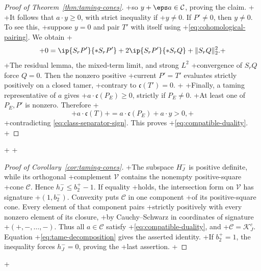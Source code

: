 \begin{proof}[Proof of Theorem~\ref{thm:taming-cones}]
+so \(y+\eps a\in\mathcal C\), proving the claim.
+
+It follows that \(a\cdot y\ge0\), with strict inequality if
+\(y\ne0\). If \(P'\ne0\), then \(y\ne0\). To see this,
+suppose \(y=0\) and pair \(T'\) with itself using
+\eqref{eq:cohomological-pairing}. We obtain
+\[
+ 0=\ip{S_rP'}{*S_rP'}+2\ip{S_rP'}{*S_rQ}+\|S_rQ\|_2^2.
+\]
+The residual lemma, the mixed-term limit, and strong \(L^2\)
+convergence of \(S_rQ\) force \(Q=0\). Then the nonzero positive
+current \(P'=T'\) evaluates strictly positively on a closed tamer,
+contrary to \(\mathfrak c(T')=0\).
+
+Finally, a taming representative of \(a\) gives
+\(a\cdot\mathfrak c(P_E)\ge0\), strictly if \(P_E\ne0\).
+At least one of \(P_E,P'\) is nonzero. Therefore
+\[
+ a\cdot\mathfrak c(T)
+ =a\cdot\mathfrak c(P_E)+a\cdot y>0,
+\]
+contradicting \eqref{eq:class-separator-sign}. This proves
+\eqref{eq:compatible-duality}.
+\end{proof}
+
+\begin{proof}[Proof of Corollary~\ref{cor:taming-cones}]
+The subspace \(H_J^-\) is positive definite, while its orthogonal
+complement \(\mathcal V\) contains the nonempty positive-square
+cone \(\mathcal C\). Hence \(h_J^-\le b_2^+-1\). If equality
+holds, the intersection form on \(\mathcal V\) has signature
+\((1,b_2^-)\). Convexity puts \(\mathcal C\) in one component
+of its positive-square cone. Every element of that component pairs
+strictly positively with every nonzero element of its closure,
+by Cauchy--Schwarz in coordinates of signature
+\((+,-,\ldots,-)\). Thus all \(a\in\mathcal C\) satisfy
+\eqref{eq:compatible-duality}, and
+\(\mathcal C=\mathcal K_J^c\). Equation
+\eqref{eq:tame-decomposition} gives the asserted identity.
+If \(b_2^+=1\), the inequality forces \(h_J^-=0\), proving the
+last assertion.
+\end{proof}
+

